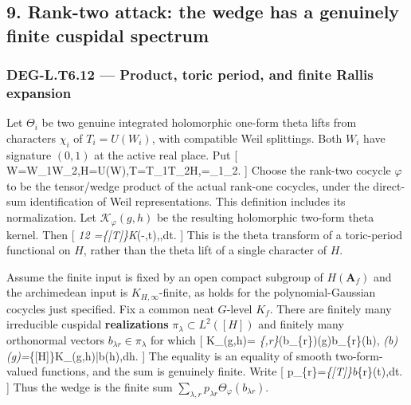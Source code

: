 \documentclass[11pt,a4paper]{article}
\theoremstyle{definition}
\begin{document}
\subsection{9. Rank-two attack: the wedge has a genuinely finite
cuspidal
spectrum}\label{rank-two-attack-the-wedge-has-a-genuinely-finite-cuspidal-spectrum}

\subsubsection{DEG-L.T6.12 --- Product, toric period, and finite Rallis
expansion}\label{deg-l.t6.12-product-toric-period-and-finite-rallis-expansion}

Let \(\Theta_i\) be two genuine integrated holomorphic one-form theta
lifts from characters \(\chi_i\) of \(T_i=U(W_i)\), with compatible Weil
splittings. Both \(W_i\) have signature \((0,1)\) at the active real
place. Put {[}
W=W\_1\perp W\_2,\quad H=U(W),\quad T=T\_1\times T\_2\subset H,\quad \chi=\chi\_1\boxtimes\chi\_2.
{]} Choose the rank-two cocycle \(\varphi\) to be the tensor/wedge
product of the actual rank-one cocycles, under the direct-sum
identification of Weil representations. This definition includes its
normalization. Let \(\mathcal K_\varphi(g,h)\) be the resulting
holomorphic two-form theta kernel. Then {[}
\Theta\emph{1\wedge\Theta\emph{2
=\int}\{{[}T{]}\}\mathcal K}\varphi(-,t),,dt.
 {]} This is the theta transform of a toric-period functional
on \(H\), rather than the theta lift of a single character of \(H\).

Assume the finite input is fixed by an open compact subgroup of
\(H(\mathbf A_f)\) and the archimedean input is \(K_{H,\infty}\)-finite,
as holds for the polynomial-Gaussian cocycles just specified. Fix a
common neat \(G\)-level \(K_f\). There are finitely many irreducible
cuspidal \textbf{realizations} \(\pi_\lambda\subset L^2([H])\) and
finitely many orthonormal vectors \(b_{\lambda r}\in\pi_\lambda\) for
which {[} \mathcal K\_\varphi(g,h)=
\sum\emph{\{\lambda,r\}\Theta}\varphi(b\_\{\lambda r\})(g)b\_\{\lambda r\}(h),
\qquad
\Theta\emph{\varphi(b)(g)=\int}\{{[}H{]}\}\mathcal K\_\varphi(g,h)\bar b(h),dh.
 {]} The equality is an equality of smooth two-form-valued
functions, and the sum is genuinely finite. Write {[}
p\_\{\lambda r\}=\int\emph{\{{[}T{]}\}b}\{\lambda r\}(t),dt.
{]} Thus the wedge is the finite sum
\(\sum_{\lambda,r}p_{\lambda r}\Theta_\varphi(b_{\lambda r})\).
\end{document}
